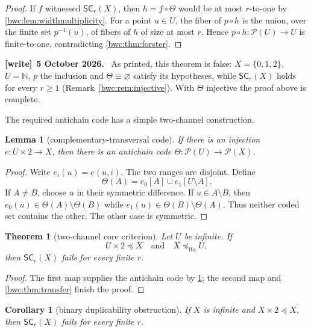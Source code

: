 \documentclass[11pt,letterpaper]{article}
\numberwithin{equation}{section}
\theoremstyle{plain}
\newtheorem{theorem}{Theorem}[section]
\newtheorem{lemma}[lemma]{Lemma}
\newtheorem{corollary}[corollary]{Corollary}
\theoremstyle{definition}
\theoremstyle{remark}
\newcommand{\Pow}{\mathcal P}
\newcommand{\NN}{\mathbb N}
\newcommand{\SC}{\mathsf{SC}}
\newcommand{\fto}{\preccurlyeq_{\mathrm{fto}}}
\newenvironment{writenote}[1][]{\par\smallskip\begingroup\small
 \noindent\textbf{[write]}\if\relax\detokenize{#1}\relax\else~\textbf{#1.}\fi\ }%
 {\par\endgroup\smallskip}
\begin{document}
\begin{proof}
If $f$ witnessed $\SC_r(X)$, then $h=f\circ\Theta$ would be at most
$r$-to-one by \cref{bwc:lem:widthmultiplicity}.  For a point $u\in U$, the fiber
of $p\circ h$ is the union, over the finite set $p^{-1}(u)$, of fibers of
$h$ of size at most $r$.  Hence $p\circ h:\Pow(U)\to U$ is finite-to-one,
contradicting \cref{bwc:thm:forster}.
\end{proof}

\begin{writenote}[5 October 2026]
As printed, this theorem is false: $X=\{0,1,2\}$, $U=\NN$, $p$ the inclusion
and $\Theta\equiv\varnothing$ satisfy its hypotheses, while $\SC_r(X)$ holds
for every $r\geq1$ (Remark~\ref{bwc:rem:injective}). With $\Theta$ injective
the proof above is complete.
\end{writenote}

The required antichain code has a simple two-channel construction.

\begin{lemma}[complementary-transversal code]\label{bwc:lem:transversal}
If there is an injection $e:U\times2\to X$, then there is an antichain code
$\Theta:\Pow(U)\to\Pow(X)$.
\end{lemma}

\begin{proof}
Write $e_i(u)=e(u,i)$.  The two ranges are disjoint.  Define
\[
       \Theta(A)=e_0[A]\cup e_1[U\setminus A].
\]
If $A\neq B$, choose $u$ in their symmetric difference.  If
$u\in A\setminus B$, then $e_0(u)\in\Theta(A)\setminus\Theta(B)$ while
$e_1(u)\in\Theta(B)\setminus\Theta(A)$.  Thus neither coded set contains the
other.  The other case is symmetric.
\end{proof}

\begin{theorem}[two-channel core criterion]\label{bwc:thm:core}
Let $U$ be infinite.  If
\[
             U\times2\preccurlyeq X
       \quad\text{and}\quad
             X\fto U,
\]
then $\SC_r(X)$ fails for every finite $r$.
\end{theorem}

\begin{proof}
The first map supplies the antichain code by \cref{bwc:lem:transversal}; the
second map and \cref{bwc:thm:transfer} finish the proof.
\end{proof}

\begin{corollary}[binary duplicability obstruction]\label{bwc:cor:duplicate}
If $X$ is infinite and $X\times2\preccurlyeq X$, then $\SC_r(X)$ fails for
every finite $r$.
\end{corollary}
\end{document}
